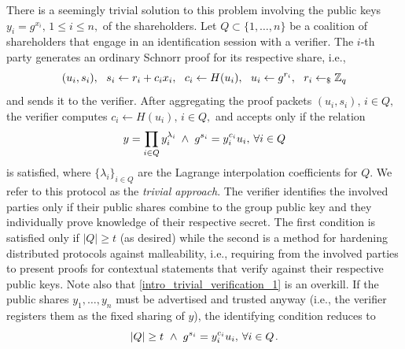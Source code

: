 \documentclass{iacrtrans}
\begin{document}
There is a seemingly trivial solution to this problem
involving the public keys
$y_i = g ^ {x_i},\hspace{2pt} 1 \le i \le n,$
of the shareholders.
Let $Q \subset \{1, \dots, n\}$
be a coalition of shareholders that engage in
an identification session with a verifier.
The $i$-th party generates
an ordinary Schnorr proof
for its respective share, i.e.,
\vspace{5pt}
\begin{equation*}
(u_i, s_i),
\ \ s_i \leftarrow r_i + c_i x_i,
\ \ c_i \leftarrow H(u_i),
\ \ u_i \leftarrow g ^ {r_i},
\ \ r_i \leftarrow_\$ \mathbb{Z}_q
\vspace{5pt}
\end{equation*}
and sends it to the verifier.
After aggregating the proof packets
$(u_i, s_i),\hspace{2pt}i \in Q,$
the verifier computes
$c_i \leftarrow H(u_i),\hspace{2pt} i \in Q,$
and accepts only if the relation
\vspace{5pt}
\begin{equation}\label{intro_trivial_verification_1}
y = \prod_{i \in Q} y_i ^{\lambda_i}
\hspace{2.50pt}
\land
\hspace{3pt}
g ^ {s_i} = y_i ^ {c_i} u_i,
\hspace{2pt}
\forall i \in Q
\vspace{5pt}
\end{equation}
is satisfied, where $\{\lambda_i\}_{i \in Q}$ are the
Lagrange interpolation coefficients for $Q$.
We refer to this protocol as the \textit{trivial approach}.
The verifier identifies the involved parties only if
their public shares combine to the group public key
and they individually prove knowledge of their respective secret.
The first condition is satisfied only if $|Q| \ge t$ (as desired)
while the second is a method for hardening
distributed protocols against malleability, i.e.,
requiring from the involved parties
to present proofs for contextual statements
that verify against their respective public keys.
Note also that \eqref{intro_trivial_verification_1} is an overkill.
If the public shares $y_1, \dots, y_n$
must be advertised and trusted anyway
(i.e., the verifier registers them as the fixed sharing of $y$),
the identifying condition reduces to
\vspace{5pt}
\begin{equation}\label{intro_trivial_verification_2}
|Q| \ge t
\hspace{3.50pt}
\land
\hspace{3pt}
g ^ {s_i} = y_i ^ {c_i} u_i,
\hspace{2pt}
\forall i \in Q
\hspace{1pt}.
\vspace{5pt}
\end{equation}
\end{document}
